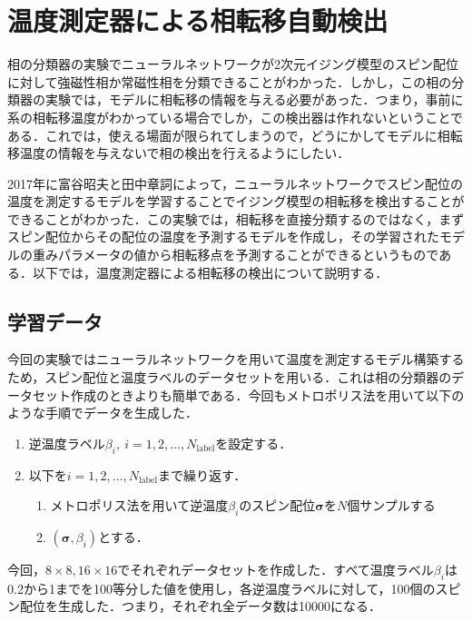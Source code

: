 \documentclass[a4paper,11pt]{jsreport}
\begin{document}
\section{温度測定器による相転移自動検出}
相の分類器の実験でニューラルネットワークが2次元イジング模型のスピン配位に対して強磁性相か常磁性相を分類できることがわかった．しかし，この相の分類器の実験では，モデルに相転移の情報を与える必要があった．つまり，事前に系の相転移温度がわかっている場合でしか，この検出器は作れないということである．これでは，使える場面が限られてしまうので，どうにかしてモデルに相転移温度の情報を与えないで相の検出を行えるようにしたい．\par
2017年に富谷昭夫と田中章詞によって，ニューラルネットワークでスピン配位の温度を測定するモデルを学習することでイジング模型の相転移を検出することができることがわかった．\cite{tanaka2017detection}この実験では，相転移を直接分類するのではなく，まずスピン配位からその配位の温度を予測するモデルを作成し，その学習されたモデルの重みパラメータの値から相転移点を予測することができるというものである．以下では，温度測定器による相転移の検出について説明する．

\subsection{学習データ}
今回の実験ではニューラルネットワークを用いて温度を測定するモデル構築するため，スピン配位と温度ラベルのデータセットを用いる．これは相の分類器のデータセット作成のときよりも簡単である．今回もメトロポリス法を用いて以下のような手順でデータを生成した．\par
\begin{enumerate}
  \item 逆温度ラベル$\beta_i, \ i=1,2,\dots,N_{\text{label}}$を設定する．
  \item 以下を$i=1,2,\dots,N_{\text{label}}$まで繰り返す．
  \begin{enumerate}
    \item メトロポリス法を用いて逆温度$\beta_i$のスピン配位$\bm{\sigma}$を$N$個サンプルする
    \item $(\bm{\sigma},\beta_i)$とする．
  \end{enumerate}
\end{enumerate}
今回，$8 \times 8, 16 \times 16$でそれぞれデータセットを作成した．すべて温度ラベル$\beta_i$は0.2から1までを100等分した値を使用し，各逆温度ラベルに対して，100個のスピン配位を生成した．つまり，それぞれ全データ数は10000になる．
\end{document}
